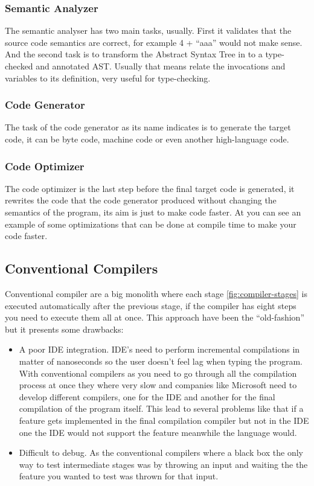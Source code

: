 \subsubsection{Semantic Analyzer}
The semantic analyser has two main tasks, usually. First it validates that the source code semantics are correct, for
example 4 + “aaa” would not make sense. And the second task is to transform the Abstract Syntax Tree in to a type-checked
and annotated AST. Usually that means relate the invocations and variables to its definition, very useful for type-checking.

\subsubsection{Code Generator}
The task of the code generator as its name indicates is to generate the target code, it can be byte code, machine code
or even another high-language code.

\subsubsection{Code Optimizer}
The code optimizer is the last step before the final target code is generated, it rewrites the code that the code generator
produced without changing the semantics of the program, its aim is just to make code faster. At \cite{compiler-optimizations}
you can see an example of some optimizations that can be done at compile time to make your code faster.

\subsection{Conventional Compilers}
Conventional compiler are a big monolith where each stage \ref{fig:compiler-stages} is executed automatically after the
previous stage, if the compiler has eight steps you need to execute them all at once. This approach have been the “old-fashion”
but it presents some drawbacks:
\begin{itemize}
    \item A poor IDE \cite{ide} integration. IDE’s need to perform incremental compilations in matter of nanoseconds so
    the user doesn’t feel lag when typing the program. With conventional compilers as you need to go through all the compilation
    process at once they where very slow and companies like Microsoft need to develop different compilers, one for the IDE and
    another for the final compilation of the program itself. This lead to several problems like that if a feature gets
    implemented in the final compilation compiler but not in the IDE one the IDE would not support the feature meanwhile
    the language would.
    \item Difficult to debug. As the conventional compilers where a black box the only way to test intermediate stages was
    by throwing an input and waiting the the feature you wanted to test was thrown for that input.
\end{itemize}

